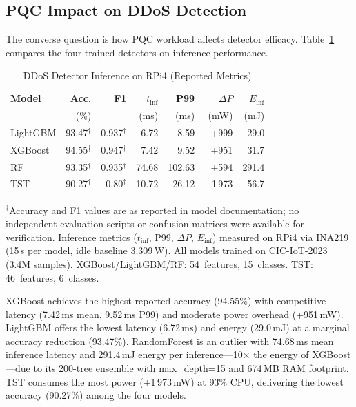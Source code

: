 \subsection{PQC Impact on DDoS Detection}
\label{sec:pqc_on_ddos}

The converse question is how PQC workload affects detector efficacy.
Table~\ref{tab:detector_compare} compares the four trained detectors
on inference performance.

\begin{table}[t]
\centering
\caption{DDoS Detector Inference on RPi4 (Reported Metrics)}
\label{tab:detector_compare}
\footnotesize
\begin{tabular}{@{}lrrrrrr@{}}
\toprule
\textbf{Model} &
  \textbf{Acc.} & \textbf{F1} &
  \textbf{$t_\text{inf}$} & \textbf{P99} &
  \textbf{$\Delta P$} & \textbf{$E_\text{inf}$} \\
& (\%) & & (ms) & (ms) & (mW) & (mJ) \\
\midrule
LightGBM & 93.47$^\dagger$ & 0.937$^\dagger$ & 6.72  & 8.59   & +999  & 29.0  \\
XGBoost  & 94.55$^\dagger$ & 0.947$^\dagger$ & 7.42  & 9.52   & +951  & 31.7  \\
RF       & 93.35$^\dagger$ & 0.935$^\dagger$ & 74.68 & 102.63 & +594  & 291.4 \\
TST      & 90.27$^\dagger$ & 0.80$^\dagger$  & 10.72 & 26.12  & +1\,973 & 56.7 \\
\bottomrule
\end{tabular}
\begin{tablenotes}
\footnotesize
\item $^\dagger$Accuracy and F1 values are as reported in model documentation;
  no independent evaluation scripts or confusion matrices were available
  for verification.  Inference metrics ($t_\text{inf}$, P99, $\Delta P$,
  $E_\text{inf}$) measured on RPi4 via INA219 (15\,s per model,
  idle baseline 3.309\,W).
  All models trained on CIC-IoT-2023 (3.4M samples).
  XGBoost/LightGBM/RF: 54~features, 15~classes.  TST: 46~features, 6~classes.
\end{tablenotes}
\end{table}

XGBoost achieves the highest reported accuracy (94.55\%) with
competitive latency (7.42\,ms mean, 9.52\,ms P99) and moderate power
overhead (+951\,mW).  LightGBM offers the lowest latency (6.72\,ms)
and energy (29.0\,mJ) at a marginal accuracy reduction (93.47\%).
RandomForest is an outlier with 74.68\,ms mean inference latency and
291.4\,mJ energy per inference—10$\times$ the energy of XGBoost—due
to its 200-tree ensemble with max\_depth=15 and 674\,MB RAM footprint.
TST consumes the most power (+1\,973\,mW) at 93\% CPU, delivering the
lowest accuracy (90.27\%) among the four models.

